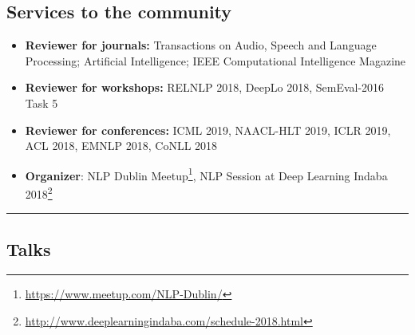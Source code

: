\documentclass[10pt,letterpaper]{article}
\begin{document}
\subsection*{Services to the community}

\begin{itemize}
	\parskip=0.1em
	
	\item \textbf{Reviewer for journals:} Transactions on Audio, Speech and Language Processing; Artificial Intelligence; IEEE Computational Intelligence Magazine
	
	\item \textbf{Reviewer for workshops:} RELNLP 2018, DeepLo 2018, SemEval-2016 Task 5
		
	\item \textbf{Reviewer for conferences:} ICML 2019, NAACL-HLT 2019, ICLR 2019, ACL 2018, EMNLP 2018, CoNLL 2018
	
	\item \textbf{Organizer}: NLP Dublin Meetup\footnote{\url{https://www.meetup.com/NLP-Dublin/}}, NLP Session at Deep Learning Indaba 2018\footnote{\url{http://www.deeplearningindaba.com/schedule-2018.html}}

\end{itemize}

\hrule
\vspace{-0.4em}
\subsection*{Talks}
\end{document}
